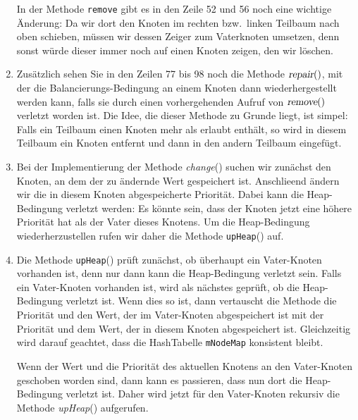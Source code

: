 \begin{enumerate}
      In der Methode \texttt{remove} gibt es in den Zeile 52 und 56 noch eine wichtige 
      Änderung: Da wir dort den Knoten im rechten bzw.~linken Teilbaum nach oben schieben,
      m\"ussen wir dessen Zeiger zum Vaterknoten umsetzen, denn sonst w\"urde dieser immer noch
      auf einen Knoten zeigen, den wir l\"oschen.
\item Zus\"atzlich sehen Sie in den Zeilen 77 bis 98 noch die Methode $\textsl{repair}()$,
      mit der die Balan\-cierungs-Bedingung an einem Knoten dann wiederhergestellt werden kann, 
      falls sie durch einen vorhergehenden Aufruf von $\textsl{remove}()$ verletzt worden ist.
      Die Idee, die dieser Methode zu Grunde liegt, ist simpel:  Falls ein Teilbaum einen Knoten
      mehr als erlaubt enth\"alt, so wird in diesem Teilbaum ein Knoten entfernt und dann in den
      andern Teilbaum eingef\"ugt.
\item Bei der Implementierung der Methode \textsl{change}() suchen wir zun\"achst
      den Knoten, an dem der zu \"andernde Wert gespeichert ist.  Anschlie\3end
      \"andern wir die in diesem Knoten abgespeicherte Priorit\"at.  Dabei kann die
      Heap-Bedingung verletzt werden: Es k\"onnte sein, dass der Knoten jetzt eine h\"ohere
      Priorit\"at hat als der Vater dieses Knotens.  Um die Heap-Bedingung
      wiederherzustellen rufen wir daher die Methode \texttt{upHeap}() auf.
\item Die Methode \texttt{upHeap}() pr\"uft zun\"achst, ob \"uberhaupt ein Vater-Knoten
      vorhanden ist, denn nur dann kann die Heap-Bedingung verletzt sein.
      Falls ein Vater-Knoten vorhanden ist, wird als n\"achstes gepr\"uft, ob die 
      Heap-Bedingung verletzt ist.  Wenn dies so ist,
      dann vertauscht die Methode die Priorit\"at und den Wert, der im Vater-Knoten
      abgespeichert ist mit der Priorit\"at und dem Wert, der in diesem Knoten 
      abgespeichert ist.  Gleichzeitig wird darauf geachtet, dass die HashTabelle
      \texttt{mNodeMap} konsistent bleibt.
      
      Wenn der Wert und die Priorit\"at des aktuellen Knotens an den Vater-Knoten
      geschoben  worden sind, dann kann es passieren, dass nun dort die Heap-Bedingung
      verletzt ist.  Daher wird jetzt f\"ur den Vater-Knoten rekursiv die Methode
      \textsl{upHeap}() aufgerufen.
\end{enumerate}


